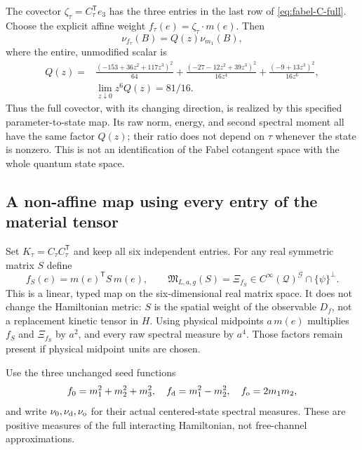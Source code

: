 The covector $\zeta_\tau=C_\tau^{\mathsf T}e_3$ has the three entries
in the last row of \eqref{eq:fabel-C-full}. Choose the explicit affine
weight $f_\tau(e)=\zeta_\tau\cdot m(e)$. Then
\[
 \nu_{f_\tau}(B)=Q(z)\nu_{m_1}(B),
\]
where the entire, unmodified scalar is
\begin{align*}
 Q(z)={}&\frac{(-153+36z^2+117z^3)^2}{64}
 +\frac{(-27-12z^2+39z^3)^2}{16z^4}
 +\frac{(-9+13z^3)^2}{16z^6},\\
 &\lim_{z\downarrow0}z^6Q(z)=81/16 .
\end{align*}
Thus the full covector, with its changing direction, is realized by this
specified parameter-to-state map. Its raw norm, energy, and second spectral
moment all have the same factor $Q(z)$; their ratio does not depend on
$\tau$ whenever the state is nonzero. This is not an identification of
the Fabel cotangent space with the whole quantum state space.

\subsection{A non-affine map using every entry of the material tensor}
Set $K_\tau=C_\tau C_\tau^{\mathsf T}$ and keep all six independent entries.
For any real symmetric matrix $S$ define
\begin{equation}\label{eq:fabel-quadratic-map}
 f_S(e)=m(e)^{\mathsf T}S\,m(e),\qquad
 \mathfrak M_{L,a,g}(S)=\Xi_{f_S}\in
 C^\infty(\mathcal Q)^{\mathcal G}\cap\{\psi\}^{\perp}.
\end{equation}
This is a linear, typed map on the six-dimensional real matrix space.
It does not change the Hamiltonian metric: $S$ is the spatial weight of
the observable $D_f$, not a replacement kinetic tensor in $H$.
Using physical midpoints $a\,m(e)$ multiplies $f_S$ and $\Xi_{f_S}$ by
$a^2$, and every raw spectral measure by $a^4$.
Those factors remain present if physical midpoint units are chosen.

Use the three unchanged seed functions
\[
 f_0=m_1^2+m_2^2+m_3^2,\quad
 f_{\rm d}=m_1^2-m_2^2,\quad f_{\rm o}=2m_1m_2,
\]
and write $\nu_0,\nu_{\rm d},\nu_{\rm o}$ for their actual centered-state
spectral measures. These are positive measures of the full interacting
Hamiltonian, not free-channel approximations.

